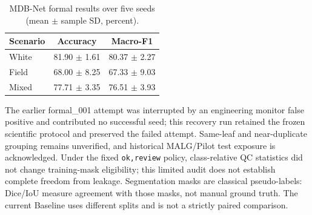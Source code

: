 \begin{table}[htbp]
\centering
\caption{MDB-Net formal results over five seeds (mean $\pm$ sample SD, percent).}
\label{tab:mdb-formal-results}
\begin{tabular}{lcc}
\hline
Scenario & Accuracy & Macro-F1 \\
\hline
White & 81.90 $\pm$ 1.61 & 80.37 $\pm$ 2.27 \\
Field & 68.00 $\pm$ 8.25 & 67.33 $\pm$ 9.03 \\
Mixed & 77.71 $\pm$ 3.35 & 76.51 $\pm$ 3.93 \\
\hline
\end{tabular}
\end{table}

The earlier formal\_001 attempt was interrupted by an engineering monitor false
positive and contributed no successful seed; this recovery run retained the
frozen scientific protocol and preserved the failed attempt. Same-leaf and
near-duplicate grouping remains unverified, and historical MALG/Pilot test
exposure is acknowledged. Under the fixed \texttt{ok,review} policy, class-relative
QC statistics did not change training-mask eligibility; this limited audit does
not establish complete freedom from leakage. Segmentation masks are classical
pseudo-labels: Dice/IoU measure agreement with those masks, not manual ground truth.
The current Baseline uses different splits and is not a strictly paired comparison.
